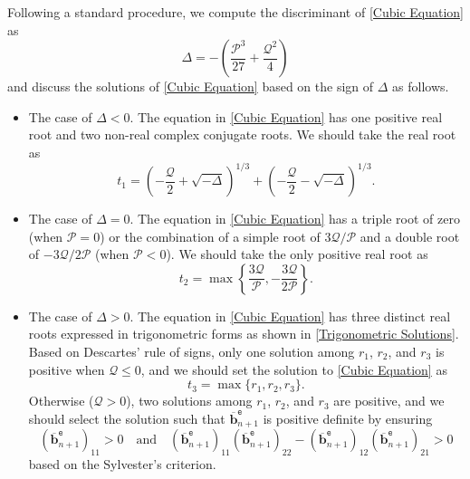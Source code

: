 \documentclass[preprint,11pt]{elsarticle}
\theoremstyle{definition}
\begin{document}
Following a standard procedure, we compute the discriminant of \eqref{Cubic Equation} as
\begin{equation*}
    \Delta = - \left( \dfrac{\mathcal{P}^3}{27} + \dfrac{\mathcal{Q}^2}{4} \right)
\end{equation*}
and discuss the solutions of \eqref{Cubic Equation} based on the sign of $\Delta$ as follows.
\begin{itemize}
    \item The case of $\Delta < 0$. The equation in \eqref{Cubic Equation} has one positive real root and two non-real complex conjugate roots. We should take the real root as
    \begin{equation*}
        t_1 = \left( -\dfrac{\mathcal{Q}}{2} + \sqrt{-\Delta} \right)^{1/3} + \left( -\dfrac{\mathcal{Q}}{2} - \sqrt{-\Delta} \right)^{1/3}.
    \end{equation*}

    \item The case of $\Delta = 0$. The equation in \eqref{Cubic Equation} has a triple root of zero (when $\mathcal{P} = 0$) or the combination of a simple root of $3\mathcal{Q} / \mathcal{P}$ and a double root of $- 3\mathcal{Q} / 2\mathcal{P}$ (when $\mathcal{P} < 0$). We should take the only positive real root as
    \begin{equation*}
        t_2 = \max \left\{ \dfrac{3 \mathcal{Q}}{\mathcal{P}}, - \dfrac{3 \mathcal{Q}}{2 \mathcal{P}} \right\}.
    \end{equation*}

    \item The case of $\Delta > 0$. The equation in \eqref{Cubic Equation} has three distinct real roots expressed in trigonometric forms as shown in \eqref{Trigonometric Solutions}. Based on Descartes' rule of signs, only one solution among $r_1$, $r_2$, and $r_3$ is positive when $\mathcal{Q} \leq 0$, and we should set the solution to \eqref{Cubic Equation} as
    \begin{equation*}
        t_3 = \max\{ r_1, r_2, r_3\}.
    \end{equation*}
    Otherwise ($\mathcal{Q} > 0$), two solutions among $r_1$, $r_2$, and $r_3$ are positive, and we should select the solution such that $\overline{\mathbf{b}}_{n+1}^\texttt{e}$ is positive definite by ensuring
    \begin{equation*}
        \left( \overline{\mathbf{b}}_{n+1}^\texttt{e} \right)_{11} > 0
        \quad \text{and} \quad
        \left( \overline{\mathbf{b}}_{n+1}^\texttt{e} \right)_{11} \left( \overline{\mathbf{b}}_{n+1}^\texttt{e} \right)_{22} - \left( \overline{\mathbf{b}}_{n+1}^\texttt{e} \right)_{12} \left( \overline{\mathbf{b}}_{n+1}^\texttt{e} \right)_{21} > 0
    \end{equation*}
    based on the Sylvester’s criterion.
\end{itemize}
\end{document}
